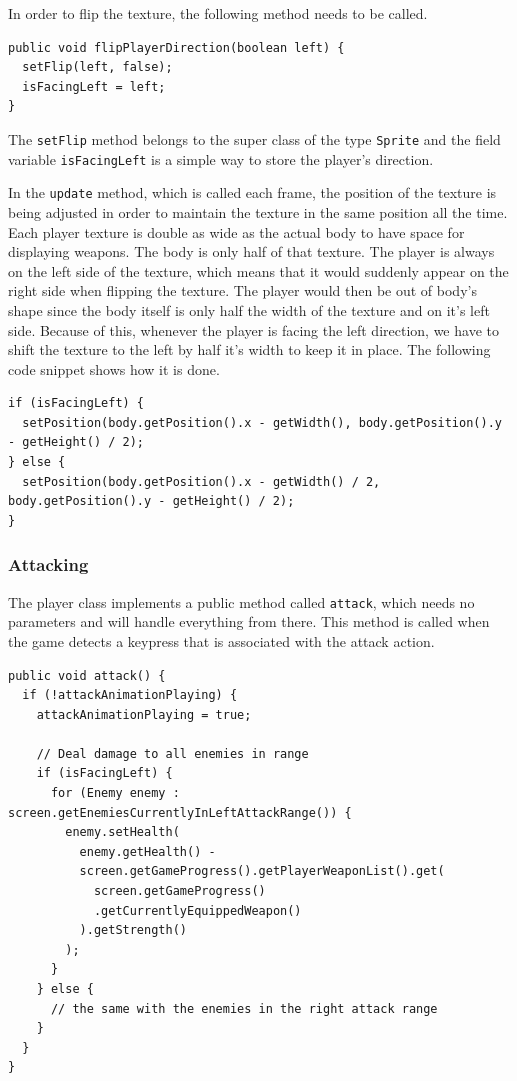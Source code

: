 \documentclass[12p]{article}
\begin{document}
In order to flip the texture, the following method needs to be called.

\begin{verbatim}
public void flipPlayerDirection(boolean left) {
  setFlip(left, false);
  isFacingLeft = left;
}
\end{verbatim}

The \texttt{setFlip} method belongs to the super class of the type \texttt{Sprite} and the field variable \texttt{isFacingLeft} is a simple way to store the player's direction.

In the \texttt{update} method, which is called each frame, the position of the texture is being adjusted in order to maintain the texture in the same position all the time. Each player texture is double as wide as the actual body to have space for displaying weapons. The body is only half of that texture. The player is always on the left side of the texture, which means that it would suddenly appear on the right side when flipping the texture. The player would then be out of body's shape since the body itself is only half the width of the texture and on it's left side. Because of this, whenever the player is facing the left direction, we have to shift the texture to the left by half it's width to keep it in place. The following code snippet shows how it is done.

\begin{verbatim}
if (isFacingLeft) {
  setPosition(body.getPosition().x - getWidth(), body.getPosition().y - getHeight() / 2);
} else {
  setPosition(body.getPosition().x - getWidth() / 2, body.getPosition().y - getHeight() / 2);
}
\end{verbatim}

\newpage
\subsubsection{Attacking}

The player class implements a public method called \texttt{attack}, which needs no parameters and will handle everything from there. This method is called when the game detects a keypress that is associated with the attack action.

\begin{verbatim}
public void attack() {
  if (!attackAnimationPlaying) {
    attackAnimationPlaying = true;

    // Deal damage to all enemies in range
    if (isFacingLeft) {
      for (Enemy enemy : screen.getEnemiesCurrentlyInLeftAttackRange()) {
        enemy.setHealth(
          enemy.getHealth() - 
          screen.getGameProgress().getPlayerWeaponList().get(
            screen.getGameProgress()
            .getCurrentlyEquippedWeapon()
          ).getStrength()
        );
      }
    } else {
      // the same with the enemies in the right attack range
    }
  }
}
\end{verbatim}
\end{document}
